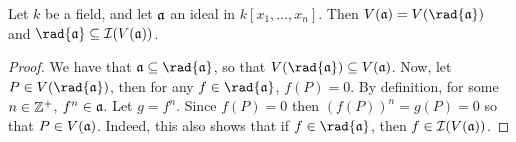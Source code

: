 \begin{proposition}\label{proposition_10.2.3}
  Let $k$ be a field, and let $\mathfrak{a}$ an ideal in $k[x_1, \dots, x_n]$.
  Then $V(\af)=V(\rad{\af})$ and $\rad{\af} \subseteq \Ic(V(\af))$.
\end{proposition}
\begin{proof}
  We have that $\af \subseteq \rad{\af}$, so that $V(\rad{\af})
  \subseteq V(\af)$. Now, let $P \in V(\rad{\af})$, then for any $f
  \in \rad{\af}$, $f(P)=0$. By definition, for some $n \in \mathbb{Z}^+$, $f^n
  \in \mathfrak{a}$. Let $g=f^n$. Since  $f(P)=0$ then $(f(P))^n=g(P)=0$ so
  that $P \in V(\mathfrak{a})$. Indeed, this also shows that if $f \in
  \rad{\af}$, then $f \in \mathcal{I}(V(\mathfrak{a}))$.
\end{proof}
